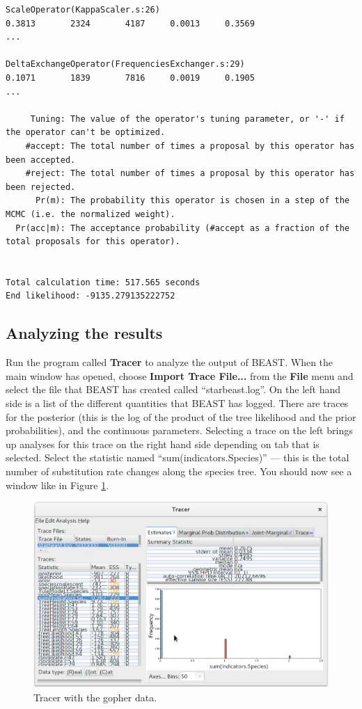 \documentclass{article}
\begin{document}
{\begin{verbatim}
ScaleOperator(KappaScaler.s:26)                                         0.3813       2324       4187     0.0013     0.3569 
...

DeltaExchangeOperator(FrequenciesExchanger.s:29)                        0.1071       1839       7816     0.0019     0.1905 
...

     Tuning: The value of the operator's tuning parameter, or '-' if the operator can't be optimized.
    #accept: The total number of times a proposal by this operator has been accepted.
    #reject: The total number of times a proposal by this operator has been rejected.
      Pr(m): The probability this operator is chosen in a step of the MCMC (i.e. the normalized weight).
  Pr(acc|m): The acceptance probability (#accept as a fraction of the total proposals for this operator).


Total calculation time: 517.565 seconds
End likelihood: -9135.279135222752
\end{verbatim}}

\subsection*{Analyzing the results}

Run the program called \textbf{Tracer} to analyze the output of BEAST. When the
main window has opened, choose \textbf{Import Trace File...} from the
\textbf{File} menu and select the file that BEAST has created called
``starbeast.log''. On the left hand side is a list of the different quantities
that BEAST has logged. There are traces for the posterior (this is the log of
the product of the tree likelihood and the prior probabilities), and the
continuous parameters. Selecting a trace on the left brings up analyses for this
trace on the right hand side depending on tab that is selected. Select the
statistic named ``sum(indicators.Species)'' --- this is the total number of substitution rate
changes along the species tree. You should now see a window like
in Figure \ref{fig:tracer}.

\begin{figure}[htb!]
\centering
\includegraphics[width=\textwidth]{figures/tracer.png}
\caption{Tracer with the gopher data.}
\label{fig:tracer}
\end{figure}
\end{document}
